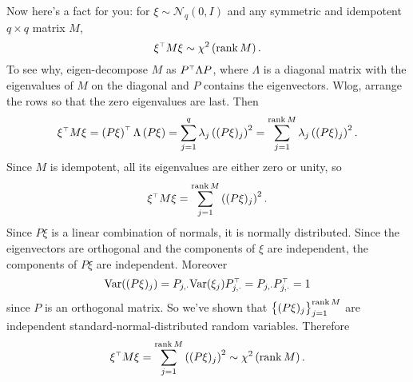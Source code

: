 \documentclass[11pt,letterpaper,reqno,oneside]{article}
\begin{document}
Now here's a fact for you: for $\xi \sim \mathcal{N}_q\left( 0, I \right)$ and any symmetric and idempotent $q \times q$ matrix $M$,
%
\begin{equation*}
	\xi^{\scriptscriptstyle \top} M \xi \sim \chi^2\left( \operatorname*{rank} M \right) .
\end{equation*}
%
To see why, eigen-decompose $M$ as $P^{\scriptscriptstyle \top} \Lambda P$, where $\Lambda$ is a diagonal matrix with the eigenvalues of $M$ on the diagonal and $P$ contains the eigenvectors. Wlog, arrange the rows so that the zero eigenvalues are last. Then
%
\begin{equation*}
	\xi^{\scriptscriptstyle \top} M \xi 
	= \left( P \xi \right)^{\scriptscriptstyle \top} 
	\Lambda
	\left( P \xi \right)
	= \sum_{j=1}^q \lambda_j \left( (P \xi)_j \right)^2
	= \sum_{j=1}^{\operatorname*{rank} M} \lambda_j \left( (P \xi)_j \right)^2 .
\end{equation*}
%
Since $M$ is idempotent, all its eigenvalues are either zero or unity, so
%
\begin{equation*}
	\xi^{\scriptscriptstyle \top} M \xi 
	= \sum_{j=1}^{\operatorname*{rank} M} \left( (P \xi)_j \right)^2 .
\end{equation*}
%
Since $P \xi$ is a linear combination of normals, it is normally distributed. Since the eigenvectors are orthogonal and the components of $\xi$ are independent, the components of $P\xi$ are independent. Moreover
%
\begin{equation*}
	\mathrm{Var}( (P\xi)_j ) 
	= P_{j,\cdot} \mathrm{Var}(\xi_j) P_{j,\cdot}^{\scriptscriptstyle \top} 
	= P_{j,\cdot} P_{j,\cdot}^{\scriptscriptstyle \top} 
	= 1
\end{equation*}
%
since $P$ is an orthogonal matrix. So we've shown that $\bigl\{ (P \xi)_j \bigr\}_{j=1}^{\operatorname*{rank} M}$ are independent standard-normal-distributed random variables. Therefore 
%
\begin{equation*}
	\xi^{\scriptscriptstyle \top} M \xi 
	= \sum_{j=1}^{\operatorname*{rank} M} \left( (P \xi)_j \right)^2
	\sim \chi^2\left( \operatorname*{rank} M \right) .
\end{equation*}
\end{document}
